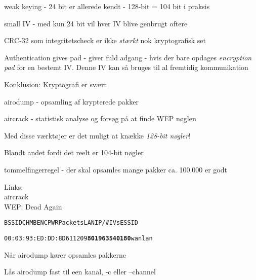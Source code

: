 \documentclass[Screen16to9,17pt]{foils}
\begin{document}

\begin{list1}
\item weak keying - 24 bit er allerede kendt - 128-bit = 104 bit i praksis
\item small IV - med kun 24 bit vil hver IV blive genbrugt oftere
\item CRC-32 som integritetscheck er ikke \emph{stærkt} nok
  kryptografisk set
\item Authentication gives pad - giver fuld adgang - hvis der bare
  opdages \emph{encryption pad} for en bestemt IV. Denne IV kan så
  bruges til al fremtidig kommunikation
\end{list1}

{\hlkbig Konklusion: Kryptografi er svært}



\begin{list1}
\item airodump - opsamling af krypterede pakker
\item aircrack - statistisk analyse og forsøg på at finde WEP nøglen
\item Med disse værktøjer er det muligt at knække \emph{128-bit nøgler}!
\item Blandt andet fordi det reelt er 104-bit nøgler \smiley
\item tommelfingerregel - der skal opsamles mange pakker ca. 100.000
  er godt
\item Links:\\
 aircrack\\
 WEP: Dead Again
\end{list1}




\begin{alltt}
\hlktiny
   BSSID              CH  MB  ENC  PWR  Packets   LAN IP / # IVs   ESSID

   00:03:93:ED:DD:8D   6  11       209   {\bf 801963                  540180}   wanlan
\end{alltt}

\begin{list1}
\item Når airodump kører opsamles pakkerne
\item Lås airodump fast til een kanal, -c eller --channel
\end{list1}
\end{document}

